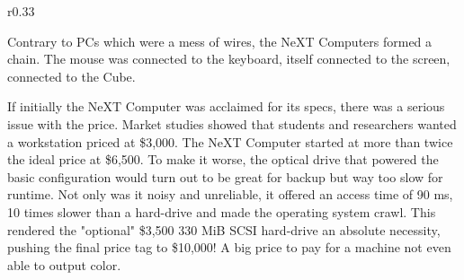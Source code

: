  


\begin{wrapfigure}[9]{r}{0.33\textwidth}
\centering
{}
\end{wrapfigure}


Contrary to PCs which were a mess of wires, the NeXT Computers formed a chain. The mouse was connected to the keyboard, itself connected to the screen, connected to the Cube.\\


\par


If initially the NeXT Computer was acclaimed for its specs, there was a serious issue with the price. Market studies showed that students and researchers wanted a workstation priced at \$3,000. The NeXT Computer started at more than twice the ideal price at \$6,500. To make it worse, the optical drive that powered the basic configuration would turn out to be great for backup but way too slow for runtime. Not only was it noisy and unreliable, it offered an access time of 90 ms, 10 times slower than a hard-drive and made the operating system crawl. This rendered the "optional" \$3,500 330 MiB SCSI hard-drive an absolute necessity, pushing the final price tag to \$10,000! A big price to pay for a machine not even able to output color.\\
\par




